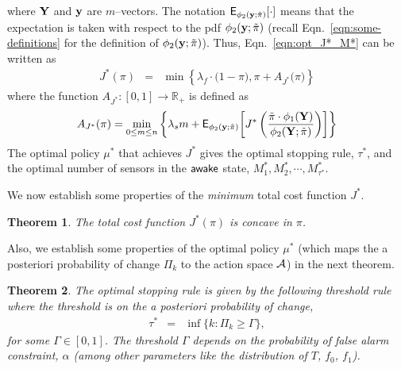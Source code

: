 \documentclass[journal]{IEEEtran}
\newcommand{\PRemPHI}{\phi_2({\bf y} ;\tilde{\pi})}
\newtheorem{theorem}{Theorem}
\newcommand{\wake}{{${\sf awake }$}}
\newcommand{\EXPm}[1]{\mathsf{E}_{\PRemPHI}\!\left[#1\right]}
\begin{document}
where ${\bf Y}$ and ${\bf y}$ are $m$--vectors.
The notation ${\mathsf E}_{\PRemPHI}[\cdot]$ means that 
the expectation is taken with respect to the pdf $\PRemPHI$
(recall Eqn.~\ref{eqn:some-definitions} for the definition of $\PRemPHI$). 
Thus, Eqn.~\ref{eqn:opt_J*_M*} can be written as 
\begin{eqnarray}
\label{eqn:opt_M_staionary_policy} 
J^*(\pi)  
& = & \min\left\{\lambda_f\cdot\big(1-\pi\big), \pi+  A_{J^*}\big(\pi\big)\right\}
\end{eqnarray}
where the function $A_{J^*}:[0,1]\to\mathbb{R}_+$ is defined as
\begin{eqnarray}
\label{eqn:OPT_CONTROL_M_A_J_STAR} 
A_{J^*}(\pi) = \min_{0\le m \le
n}\left\{\lambda_sm + \EXPm{
J^*\left(\frac{\tilde{\pi}\cdot\phi_1({\bf Y})}{\phi_2({\bf Y};\tilde{\pi})}\right) 
} \right\} 
\end{eqnarray}
The optimal policy $\mu^*$ that achieves $J^*$ gives the optimal
stopping rule, $\tau^*$, and the optimal number of sensors in the
{\wake} state, 
$M_1^*, 
M_2^*, \cdots, 
M_{\tau^*}^*$. 



\vspace{5mm}

\noindent
We now establish some properties of the {\em minimum} total cost
function $J^*$. 


\begin{theorem}
\label{thm:opt_m_J*_concave}
The total cost function $J^*({\pi})$ is concave in $\pi$. 
\end{theorem}

\vspace{5mm}

\noindent
Also, we establish some properties of the 
optimal policy $\mu^*$ (which
maps the a posteriori probability of change $\Pi_k$ to the action
space ${\cal A}$) in the next theorem. 

\begin{theorem}
\label{thm:policy-M}
The optimal stopping rule is given by the following threshold rule
where the threshold is on the a posteriori probability of change,
\begin{eqnarray}
\tau^* & = & \inf\{k: \Pi_k \geqslant \Gamma\},
\end{eqnarray}
for some $\Gamma \in [0, 1]$. The threshold $\Gamma$ depends on the
probability of false alarm constraint, $\alpha$ (among other parameters
like the distribution of $T$, $f_0$, $f_1$). 
\end{theorem}
\end{document}

